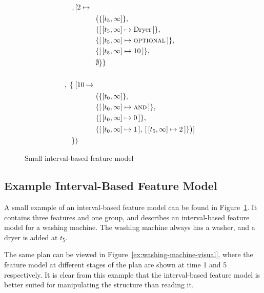 \begin{figure}[htpb]
\begin{align*}
\begin{aligned}
                \end{aligned} \\
         ,\, & [ 2 \mapsto \\
             & \hspace{1cm} \begin{aligned} & \big(\{\interval{t_5}{\forever}\} ,\, \\
             & \{\intervalmapping{t_5}{\forever}{\text{Dryer}}\} ,\, \\
             & \{\intervalmapping{t_5}{\forever}{\optional{}}\} ,\, \\
             &  \{\intervalmapping{t_5}{\forever}{10}\} ,\, \\ 
             & \emptyset\big) \}\\
               \end{aligned} \\
             \\
         ,\; \{ \; & [ 10 \mapsto \\
                   & \hspace{1cm} \begin{aligned} & \big(\{\interval{t_0}{\forever}\} ,\, \\
                         & \{\intervalmapping{t_0}{\forever}{\andtype{}}\} ,\, \\
                         & \{\intervalmapping{t_0}{\forever}{0}\} ,\, \\
                         & \{\intervalmapping{t_0}{\forever}{1},\, \intervalmapping{t_5}{\forever}{2}\} \big) ]\\
                     \end{aligned}\\
    \}&)\\
  \end{align*}
  \caption{Small interval-based feature model}
  \label{ex:washing-machine}
\end{figure}


\subsection{Example \textemdash{} Interval-Based Feature Model}
A small example of an interval-based feature model can be found in Figure~\ref{ex:washing-machine}. It contains three features and one group, and describes an interval-based feature model for a washing machine. The washing machine always has a washer, and a dryer is added at $t_5$. 

The same plan can be viewed in Figure~\ref{ex:washing-machine-visual}, where the feature model at different stages of the plan are shown at time 1 and 5 respectively. It is clear from this example that the interval-based feature model is better suited for manipulating the structure than reading it. 

